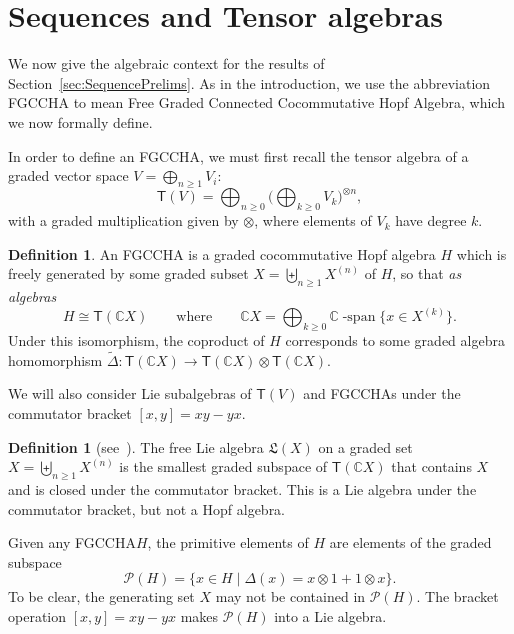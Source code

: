 \documentclass[11pt]{amsart}
\theoremstyle{definition}
\newtheorem{definition}[theorem]{Definition}
\numberwithin{equation}{section}
\def\CC{{\mathbb C}}
\newcommand{\FGCCHA}{\textsf{FGCCHA}\xspace}
\newcommand{\FGCCHAs}{\textsf{FGCCHA}s\xspace}
\newcommand{\lucas}[1]{\todo[size=\tiny,color=red!50]{#1 \\ \hfill --- Lucas}}
\begin{document}
\section{Sequences and Tensor algebras}
\label{sec:HopfAlgebra}

We now give the algebraic context for the results of Section~\ref{sec:SequencePrelims}.  
As in the introduction, we use the abbreviation \FGCCHA to mean \textsf{F}ree \textsf{G}raded \textsf{C}onnected \textsf{C}ocommutative \textsf{H}opf \textsf{A}lgebra, which we now formally define.

In order to define an \FGCCHA, we must first recall the tensor algebra of a graded vector space $V = \bigoplus_{n \ge 1} V_{i}$:
\begin{equation}
\label{eq:tensoralg}
\mathsf{T}(V) = \bigoplus_{n \ge 0} \Big( \bigoplus_{k \ge 0} V_{k} \Big)^{\otimes n},
\end{equation}
with a graded multiplication given by $\otimes$, where elements of $V_{k}$ have degree $k$.  

\begin{definition}
\label{def:FGCCHA}
An \FGCCHA is a graded cocommutative Hopf algebra $H$ which is freely generated by some graded subset $X = \biguplus_{n \ge 1} X^{(n)}$ of $H$, so that \textit{as algebras}
\[
H \cong \mathsf{T}(\CC X) 
\qquad\text{where}\qquad
\CC X = \bigoplus_{k \ge 0} \CC\operatorname{-span}\{x \in X^{(k)}\}.
\]
Under this isomorphism, the coproduct of $H$ corresponds to some graded algebra homomorphism $\tilde{\Delta}: \mathsf{T}(\CC X) \to \mathsf{T}(\CC X) \otimes \mathsf{T}(\CC X)$.
\end{definition}

We will also consider Lie subalgebras of $\mathsf{T}(V)$ and \FGCCHAs under the commutator bracket $[x, y] = xy - yx$.

\begin{definition}[{see~\cite[\S 0.2]{Reutenauer-FreeLieAlgebras}}]
\label{defn:freelie}
The free Lie algebra $\mathfrak{L}(X)$ on a graded set $X = \biguplus_{n\ge 1} X^{(n)}$ is the smallest graded subspace of $\mathsf{T}(\CC X)$ that contains $X$ and is closed under the commutator bracket.  
This is a Lie algebra under the commutator bracket, but not a Hopf algebra.
\end{definition}

Given any \FGCCHA $H$, the primitive elements of $H$ are elements of the graded subspace
\[
\mathcal{P}(H) = \{x \in H \;|\; \Delta(x) = x \otimes 1 + 1 \otimes x\}.
\]
To be clear, the generating set $X$ may not be contained in $\mathcal{P}(H)$.  
The bracket operation $[x,y] = xy - yx$ makes $\mathcal{P}(H)$ into a Lie algebra.  
\end{document}
